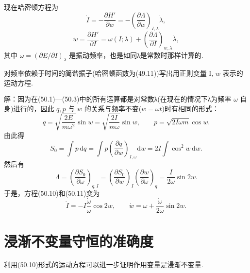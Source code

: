 现在哈密顿方程为
\begin{equation}
  \dot{I}=-\frac{\partial H'}{\partial w}
  =-\left(\frac{\partial\Lambda}{\partial w}\right)_{I,\lambda}\dot{\lambda},
\end{equation}
\begin{equation}
  \dot{w}=\frac{\partial H'}{\partial I}
  =\omega(I;\lambda)+\left(\frac{\partial\Lambda}{\partial I}\right)_{w,\lambda}
  \dot{\lambda},
\end{equation}
其中 $\omega=(\partial E/\partial I)_\lambda$
是振动频率，也是如同λ是常数时那样计算的.

\begin{xiti}

\quad 对频率依赖于时间的简谐振子(哈密顿函数为(49.11))写出用正则变量
I, $w$ 表示的运动方程.

解：因为在(50.1)—(50.3)中的所有运算都是对常数λ(在现在的情况下λ为频率
$\omega$ 自身)进行的，因此 $q,p$ 与 $w$
的关系与频率不变($w=\omega t$)时有相同的形式：
\begin{equation*}
  q=\sqrt{\frac{2E}{m\omega^2}}\sin w
  =\sqrt{\frac{2I}{m\omega}}\sin w,\qquad
  p=\sqrt{2I\omega m}\cos w.
\end{equation*}
由此得
\begin{equation*}
  S_0=\int p\,\mathrm{d}q
  =\int p\left(\frac{\partial q}{\partial w}\right)_{I,\omega}\mathrm{d}w
  =2I\int\cos^2 w\,\mathrm{d}w.
\end{equation*}
然后有
\begin{equation*}
  \Lambda=\left(\frac{\partial S_0}{\partial\omega}\right)_{q,I}
  =\left(\frac{\partial S_0}{\partial w}\right)_I
  \left(\frac{\partial w}{\partial\omega}\right)_q
  =\frac{I}{2\omega}\sin 2w.
\end{equation*}
于是，方程(50.10)和(50.11)变为
\begin{equation*}
  \dot{I}=-I\frac{\dot{\omega}}{\omega}\cos 2w,\qquad
  \dot{w}=\omega+\frac{\dot{\omega}}{2\omega}\sin 2w.
\end{equation*}

\end{xiti}

\section{浸渐不变量守恒的准确度}

利用(50.10)形式的运动方程可以进一步证明作用变量是浸渐不变量.

